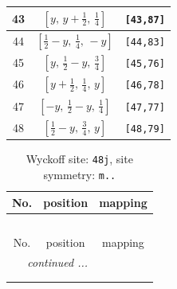 \documentclass[fleqn,8pt]{jsarticle}
\begin{document}
\begin{longtable}{ccc}
43 & $\left[ y,\, y + \frac{1}{2},\, \frac{1}{4} \right]$ & {\tt [43,87]} \\ \hline
44 & $\left[ \frac{1}{2} - y,\, \frac{1}{4},\, - y \right]$ & {\tt [44,83]} \\ \hline
45 & $\left[ y,\, \frac{1}{2} - y,\, \frac{3}{4} \right]$ & {\tt [45,76]} \\ \hline
46 & $\left[ y + \frac{1}{2},\, \frac{1}{4},\, y \right]$ & {\tt [46,78]} \\ \hline
47 & $\left[ - y,\, \frac{1}{2} - y,\, \frac{1}{4} \right]$ & {\tt [47,77]} \\ \hline
48 & $\left[ \frac{1}{2} - y,\, \frac{3}{4},\, y \right]$ & {\tt [48,79]} \\
\end{longtable}
\renewcommand{\arraystretch}{1.2}
\begin{longtable}{ccc}
\caption{Wyckoff site: {\tt 48j}, site symmetry: {\tt m..}}
 \\
 \hline \hline
No. & position & mapping \\ \hline \endfirsthead

\multicolumn{2}{l}{\tablename\ \thetable{}} \\
 \hline \hline
No. & position & mapping \\ \hline \endhead

 \hline \hline
\multicolumn{2}{r}{\footnotesize\it continued ...} \\ \endfoot

 \hline \hline
\multicolumn{2}{r}{} \\ \endlastfoot


\end{longtable}
\end{document}
